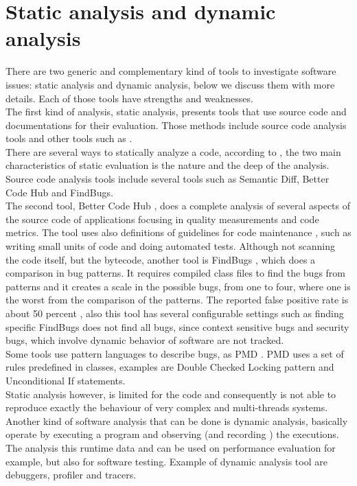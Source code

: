 \section{Static analysis and dynamic analysis}
There are two generic and complementary kind of tools to investigate software issues: static analysis and dynamic analysis, below we discuss them with more details. Each of those tools have strengths and weaknesses.\\
The first kind of analysis, static analysis, presents tools that use source code and documentations for their evaluation. Those methods include source code analysis tools \cite{source_code_analysis} and other tools such as \cite{better_code_hub}\cite{Jackson1994SDT645543655704}.\\
There are several ways to statically analyze a code, according to \cite{ind_perspective}, the two main characteristics of static evaluation is the nature and the deep of the analysis. Source code analysis tools include several tools such as Semantic Diff, Better Code Hub and FindBugs. \\
The second tool, Better Code Hub \cite{better_code_hub}, does a complete analysis of several aspects of the source code of applications focusing in quality measurements and code metrics. The tool uses also definitions of guidelines for code maintenance , such as writing small units of code and doing automated tests.
Although not scanning the code itself, but the bytecode, another tool is FindBugs \cite{find_bugs}, which does a comparison in bug patterns. It requires compiled class files to find the bugs from patterns and it creates a scale in the possible bugs, from one to four, where one is the worst from the comparison of the patterns. The reported false positive rate is about 50 percent \cite{find_rate}, also this tool has several configurable settings such as finding specific FindBugs does not find all bugs, since context sensitive bugs and security bugs, which involve dynamic behavior of software are not tracked.  \\
Some tools use pattern languages to describe bugs, as PMD \cite{pmd_tool}. PMD uses a set of rules predefined in classes, examples are Double Checked Locking pattern and Unconditional If statements. \\
Static analysis however, is limited for the code and consequently is not able to reproduce exactly the behaviour of very complex and multi-threads systems. 
Another kind of software analysis that can be done is dynamic analysis, basically operate by executing a program and observing (and recording ) the executions. The analysis this runtime data and can be used on performance evaluation for example, but also for software testing. Example of dynamic analysis tool are debuggers, profiler and tracers.\\


